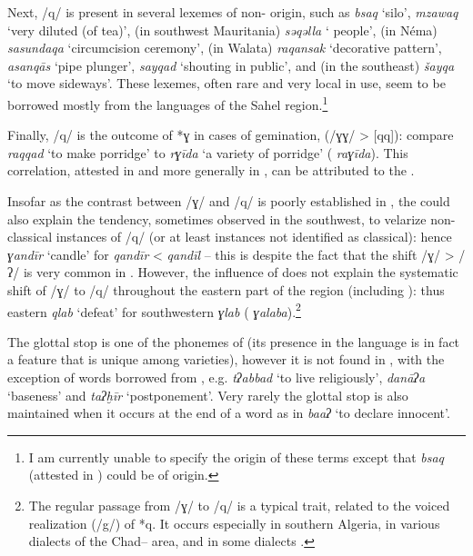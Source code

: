 \documentclass[output=paper]{langsci/langscibook}
\begin{document}
Next, /q/ is present in several lexemes of non- origin, such as \textit{bsaq} ‘silo’, \textit{mzaw{\R}aq} ‘very diluted (of tea)’, (in southwest Mauritania) \textit{sə{\R}qəlla} ‘ people’, (in Néma) \textit{sasundaqa} ‘circumcision ceremony’, (in Walata) \textit{raqansak} ‘decorative pattern’, \textit{asanqās} ‘pipe plunger’, \textit{sayqad} ‘shouting in public’, and (in the southeast) \textit{šayqa} ‘to move sideways’. These lexemes, often rare and very local in use, seem to be borrowed mostly from the languages of the Sahel region.\footnote{I am currently unable to specify the origin of these terms except that \textit{bsaq} (attested in ) could be of  origin.}

Finally, /q/ is the outcome of *ɣ in cases of gemination, (/ɣɣ/ > [qq]): compare \textit{raqqad} ‘to make porridge’ to \textit{rɣīda} ‘a variety of porridge’ ( \textit{raɣīda}). This correlation, attested in  and more generally in , can be attributed to the .

Insofar as the contrast between /ɣ/ and /q/ is poorly established in , the  could also explain the tendency, sometimes observed in the southwest, to velarize non-classical instances of /q/ (or at least instances not identified as classical): hence \textit{ɣandīr} ‘candle’ for \textit{qandīr} <  \textit{qandīl} – this is despite the fact that the shift /ɣ/ > /ʔ/ is very common in . However, the influence of  does not explain the systematic shift of /ɣ/ to /q/ throughout the eastern part of the  region (including ): thus eastern \textit{qlab} ‘defeat’ for southwestern \textit{ɣlab} ( \textit{ɣalaba}).\footnote{The regular passage from /ɣ/ to /q/ is a typical  trait, related to the voiced realization (/g/) of *q. It occurs especially in southern Algeria, in various dialects of the Chad– area, and in some  dialects \citep[72]{Cantineau1960book}.}

The glottal stop is one of the phonemes of  (its presence in the language is in fact a feature that is unique among  varieties), however it is not found in , with the exception of words borrowed from  , e.g. \textit{tʔabbad} ‘to live religiously’, \textit{danāʔa} ‘baseness’ and \textit{taʔḫīr} ‘postponement’. Very rarely the glottal stop is also maintained when it occurs at the end of a word as in \textit{ba{\R}{\R}aʔ} ‘to declare innocent’.
\end{document}
